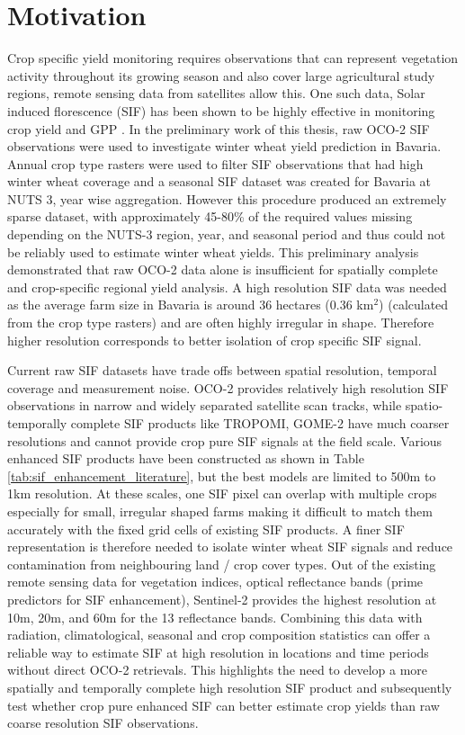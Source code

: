\section{Motivation}

Crop specific yield monitoring requires observations that can represent vegetation activity throughout its growing season and also cover large agricultural study regions, remote sensing data from satellites allow this. One such data, Solar induced florescence (SIF) has been shown to be highly effective in monitoring crop yield and GPP  \cite{turner2021extreme, magney2020covariation, frankenberg2011new, joiner2011first}. In the preliminary work of this thesis, raw OCO-2 SIF observations were used to investigate winter wheat yield prediction in Bavaria. Annual crop type rasters were used to filter SIF observations that had high winter wheat coverage and a seasonal SIF dataset was created for Bavaria at NUTS 3, year wise aggregation. However this procedure produced an extremely sparse dataset, with approximately 45-80\% of the required values missing depending on the NUTS-3 region, year, and seasonal period and thus could not be reliably used to estimate winter wheat yields. This preliminary analysis demonstrated that raw OCO-2 data alone is insufficient for spatially complete and crop-specific regional yield analysis. A high resolution SIF data was needed as the average farm size in Bavaria is around 36 hectares (0.36 km$^2$) (calculated from the crop type rasters) and are often highly irregular in shape. Therefore higher resolution corresponds to better isolation of crop specific SIF signal. 

Current raw SIF datasets have trade offs between spatial resolution, temporal coverage and measurement noise. OCO-2 provides relatively high resolution SIF observations in narrow and widely separated satellite scan tracks, while spatio-temporally complete SIF products like TROPOMI, GOME-2 have much coarser resolutions and cannot provide crop pure SIF signals at the field scale. Various enhanced SIF products have been constructed as shown in Table \ref{tab:sif_enhancement_literature}, but the best models are limited to 500m to 1km resolution. At these scales, one SIF pixel can overlap with multiple crops especially for small, irregular shaped farms making it difficult to match them accurately with the fixed grid cells of existing SIF products. A finer SIF representation is therefore needed to isolate winter wheat SIF signals and reduce contamination from neighbouring land / crop cover types. Out of the existing remote sensing data for vegetation indices, optical reflectance bands (prime predictors for SIF enhancement), Sentinel-2 provides the highest resolution at 10m, 20m, and 60m for the 13 reflectance bands. Combining this data with radiation, climatological, seasonal and crop composition statistics can offer a reliable way to estimate SIF at high resolution in locations and time periods without direct OCO-2 retrievals. This highlights the need to develop a more spatially and temporally complete high resolution SIF product and subsequently test whether crop pure enhanced SIF can better estimate crop yields than raw coarse resolution SIF observations. 

